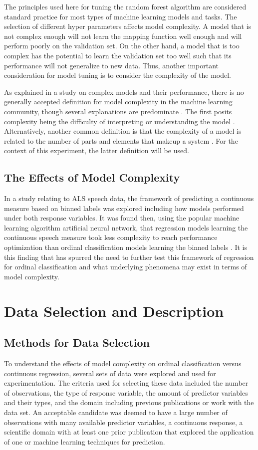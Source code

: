 \documentclass[10pt]{article}\usepackage[]{graphicx}\usepackage[]{xcolor}
\begin{document}
The principles used here for tuning the random forest algorithm are considered standard practice for most types of machine learning models and tasks. The selection of different hyper parameters affects model complexity. A model that is not complex enough will not learn the mapping function well enough and will perform poorly on the validation set. On the other hand, a model that is too complex has the potential to learn the validation set too well such that its performance will not generalize to new data. Thus, another important consideration for model tuning is to consider the complexity of the model.

As explained in a study on complex models and their performance, there is no generally accepted definition for model complexity in the machine learning community, though several explanations are predominate \cite{Quote:Chwif}. The first posits complexity being the difficulty of interpreting or understanding the model \cite{Quote:Golay}. Alternatively, another common definition is that the complexity of a model is related to the number of parts and elements that makeup a system \cite{Quote:Simon}. For the context of this experiment, the latter definition will be used.

\subsection{The Effects of Model Complexity}
In a study relating to ALS speech data, the framework of predicting a continuous measure based on binned labels was explored including how models performed under both response variables. It was found then, using the popular machine learning algorithm artificial neural network, that regression models learning the continuous speech measure took less complexity to reach performance optimization than ordinal classification models learning the binned labels \cite{Wisler}. It is this finding that has spurred the need to further test this framework of regression for ordinal classification and what underlying phenomena may exist in terms of model complexity.



\section{Data Selection and Description}
\subsection{Methods for Data Selection}
To understand the effects of model complexity on ordinal classification versus continuous regression, several sets of data were explored and used for experimentation. The criteria used for selecting these data included the number of observations, the type of response variable, the amount of predictor variables and their types, and the domain including previous publications or work with the data set. An acceptable candidate was deemed to have a large number of observations with many available predictor variables, a continuous response, a scientific domain with at least one prior publication that explored the application of one or machine learning techniques for prediction.
\end{document}
